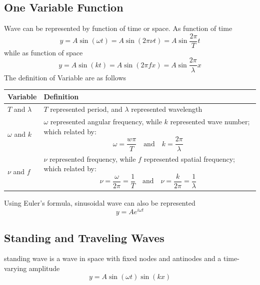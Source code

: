 \documentclass[../../main.tex]{subfiles}
\begin{document}
\subsection{One Variable Function}
Wave can be represented by function of time or space. As function of time
\begin{equation*}
    y = A \sin(\omega t) = A \sin(2\pi \nu t) =A\sin \frac{2\pi}{T}t
\end{equation*}
while as function of space
\begin{equation*}
    y = A \sin(k t) = A \sin(2\pi f x) =A\sin \frac{2\pi}{\lambda}x
\end{equation*}
The definition of Variable are as follows
\begin{center}
    \begin{longtable}{| p{} | p{} |}
        \hline Variable&Definition\\\hline\hline
        $T$ and $\lambda$&$T$ represented period, and $\lambda$ represented wavelength\\\hline
        $\omega$ and $k$&$\omega$ represented angular frequency, while $k$ represented wave number; which related by:\begin{equation*}
            \omega=\frac{w\pi}{T}\quad\text{and}\quad k=\frac{2\pi}{\lambda}
        \end{equation*}\\\hline
        $\nu$ and $f$&$\nu$ represented frequency, while $f$ represented spatial frequency; which related by:\begin{equation*}
            \nu=\frac{\omega}{2\pi}=\frac{1}{T}\quad 
            \text{and}
            \quad \nu=\frac{k}{2\pi}=\frac{1}{\lambda}
        \end{equation*}\\\hline
    \end{longtable}
\end{center}

Using Euler's formula, sinusoidal wave can also be represented
\begin{equation*}
    y=Ae^{i\omega t}
\end{equation*}

\subsection{Standing and Traveling Waves}
standing wave is a wave in space with fixed nodes and antinodes and a time-varying amplitude
\begin{equation*}
    y = A \sin(\omega t) \sin(kx)
\end{equation*}
\end{document}

